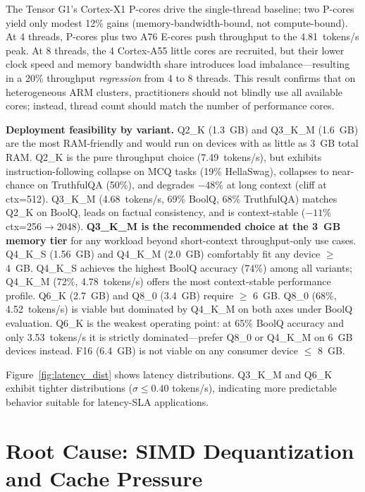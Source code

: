 \documentclass[conference]{IEEEtran}
\begin{document}
The Tensor G1's Cortex-X1 P-cores drive the single-thread baseline; two P-cores yield
only modest 12\% gains (memory-bandwidth-bound, not compute-bound). At 4 threads,
P-cores plus two A76 E-cores push throughput to the 4.81~tokens/s peak.
At 8 threads, the 4 Cortex-A55 little cores are recruited, but their lower
clock speed and memory bandwidth share introduces load imbalance---resulting in
a 20\% throughput \textit{regression} from 4 to 8 threads. This result
confirms that on heterogeneous ARM clusters, practitioners should not blindly
use all available cores; instead, thread count should match the number of
performance cores.

\textbf{Deployment feasibility by variant.}
Q2\_K (1.3~GB) and Q3\_K\_M (1.6~GB) are the most RAM-friendly and would
run on devices with as little as 3~GB total RAM.
Q2\_K is the pure throughput choice (7.49~tokens/s), but exhibits
instruction-following collapse on MCQ tasks (19\% HellaSwag),
collapses to near-chance on TruthfulQA (50\%), and degrades $-48\%$
at long context (cliff at ctx=512).
Q3\_K\_M (4.68~tokens/s, 69\% BoolQ, 68\% TruthfulQA) matches Q2\_K on
BoolQ, leads on factual consistency, and is context-stable ($-11\%$ ctx=256$\to$2048).
\textbf{Q3\_K\_M is the recommended choice at the 3~GB memory tier}
for any workload beyond short-context throughput-only use cases.
Q4\_K\_S (1.56~GB) and Q4\_K\_M (2.0~GB) comfortably fit any device $\geq$ 4~GB.
Q4\_K\_S achieves the highest BoolQ accuracy (74\%) among all variants; Q4\_K\_M
(72\%, 4.78~tokens/s) offers the most context-stable performance profile.
Q6\_K (2.7~GB) and Q8\_0 (3.4~GB) require $\geq$ 6~GB. Q8\_0 (68\%, 4.52~tokens/s)
is viable but dominated by Q4\_K\_M on both axes under BoolQ evaluation.
Q6\_K is the weakest operating point: at 65\% BoolQ accuracy and
only 3.53~tokens/s it is strictly dominated---prefer Q8\_0 or Q4\_K\_M on 6~GB
devices instead.
F16 (6.4~GB) is not viable on any consumer device $\leq$ 8~GB.

Figure~\ref{fig:latency_dist} shows latency distributions. Q3\_K\_M and Q6\_K
exhibit tighter distributions ($\sigma \leq 0.40$ tokens/s), indicating more
predictable behavior suitable for latency-SLA applications.

\section{Root Cause: SIMD Dequantization and Cache Pressure}
\label{sec:mechanism}
\end{document}

